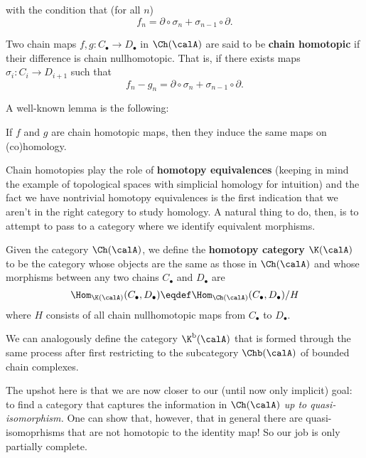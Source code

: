 \documentclass[12pt]{article}
\begin{document}
\noindent with the condition that (for all $n$)
\[f_n=\partial\circ\sigma_n+\sigma_{n-1}\circ \partial.\]
\begin{defn}
	Two chain maps $f,g:C_\bullet\to D_\bullet$ in $\Ch(\calA)$ are said to be \textbf{chain homotopic} if their difference is chain nullhomotopic. That is, if 
	there exists maps $\sigma_i:C_i\to D_{i+1}$ such that 
	\[f_n-g_n=\partial\circ\sigma_n+\sigma_{n-1}\circ\partial.\]
\end{defn}

A well-known lemma is the following:
\begin{lem}
	If $f$ and $g$ are chain homotopic maps, then they induce the same maps on (co)homology.
\end{lem}

Chain homotopies play the role of \textbf{homotopy equivalences} (keeping in mind the example of topological spaces with simplicial homology for intuition) and 
the fact we have nontrivial homotopy equivalences is the first indication that we aren't in the right category to study homology. A natural thing to do, then, is to 
attempt to pass to a category where we identify equivalent morphisms.

\begin{defn}
	Given the category $\Ch(\calA)$, we define the \textbf{homotopy category} $\K(\calA)$ to be the category whose objects are the 
	same as those in $\Ch(\calA)$ and whose morphisms between any two chains $C_\bullet$ and $D_\bullet$ are 
	\[\Hom_{\K(\calA)}(C_\bullet,D_\bullet)\eqdef \Hom_{\Ch(\calA)}(C_\bullet,D_\bullet)/H\]
	where $H$ consists of all chain nullhomotopic maps from $C_\bullet$ to $D_\bullet$.
\end{defn}

\begin{rmk}
	We can analogously define the category $\K^\text{b}(\calA)$ that is formed through the 
	same process after first restricting to the subcategory $\Chb(\calA)$ of bounded chain complexes.
\end{rmk}

The upshot here is that we are now closer to our (until now only implicit) goal: to find a category that captures the information 
in $\Ch(\calA)$ \textit{up to quasi-isomorphism.} One can show that, however, that in general there are quasi-isomoprhisms that are not 
homotopic to the identity map! So our job is only partially complete. 
\end{document}
